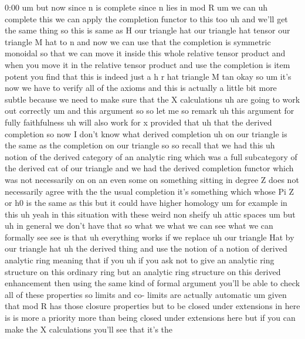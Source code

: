 \begin{unfinished}{0:00}
um  but  now  since  n  is  complete  since  n
lies  in  mod  R
um  we  can  uh  complete  this  we  can  apply
the  completion  functor  to  this  too  uh
and  we'll  get  the  same  thing  so  this  is
same  as
H  our  triangle  hat  our  triangle  hat
tensor  our  triangle  M  hat  to  n  and  now
we  can  use  that  the  completion  is
symmetric  monoidal  so  that  we  can  move
it  inside  this  whole  relative  tensor
product  and  when  you  move  it  in  the
relative  tensor  product  and  use  the
completion  is  item  potent  you  find  that
this  is  indeed  just  a  h  r  hat
triangle  M
tan
okay
so  um  it's  now  we  have  to  verify  all  of
the  axioms  and  this  is  actually  a  little
bit  more  subtle  because  we  need  to  make
sure  that  the  X
calculations  uh  are  going  to  work  out
correctly  um  and  this  argument  so  so  let
me  so  remark  uh  this
argument  for  fully
faithfulness  uh  will  also  work  for
x
provided  that  uh  that  the  derived
completion  so  now  I  don't  know  what
derived  completion  uh  on  our  triangle  is
the  same  as  the  completion  on  our
triangle
so  so  recall  that  we  had  this  uh  notion
of  the  derived  category  of  an  analytic
ring  which  was  a  full  subcategory  of  the
derived  cat  of  our  triangle  and  we  had
the  derived  completion  functor  which  was
not  necessarily  on  on  an  even  some  on
something  sitting  in  degree  Z  does  not
necessarily  agree  with  the  the  usual
completion  it's  something  which  whose  Pi
Z  or  h0  is  the  same  as  this  but  it  could
have  higher
homology  um  for  example  in  this  uh  yeah
in  this  situation  with  these  weird  non
sheify  uh  attic
spaces  um
but  uh  in  general  we  don't  have  that  so
what  we  what  we  can
see  what  we  can  formally
see  see  is
that  uh  everything
works  if  we
replace  uh  our  triangle  Hat  by  our
triangle  hat  uh  the  derived  thing  and
use  the  notion
of  a  notion  of  derived  analytic
ring  meaning  that  if
you
uh  if  you  ask  not  to  give  an  analytic
ring  structure  on  this  ordinary  ring  but
an  analytic  ring  structure  on  this
derived  enhancement  then  using  the  same
kind  of  formal  argument  you'll  be  able
to  check  all  of  these  properties  so
limits  and  co-  limits  are  actually
automatic  um  given  that  mod  R  has  those
closure  properties  but  to  be  closed
under  extensions  in  here  is  is  more  a
priority  more  than  being  closed  under
extensions  here  but  if  you  can  make  the
X  calculations  you'll  see  that  it's  the

\end{unfinished}
